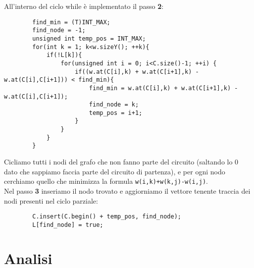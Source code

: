 \documentclass[]{article}
\begin{document}
\begin{flushleft}
All'interno del ciclo while è implementato il passo \textbf{2}:
\lstset{language=c++, style=mystyle, firstnumber=15}
\begin{lstlisting}
        find_min = (T)INT_MAX;
        find_node = -1;
        unsigned int temp_pos = INT_MAX;
        for(int k = 1; k<w.sizeY(); ++k){
            if(!L[k]){
                for(unsigned int i = 0; i<C.size()-1; ++i) {
                    if((w.at(C[i],k) + w.at(C[i+1],k) - w.at(C[i],C[i+1])) < find_min){
                        find_min = w.at(C[i],k) + w.at(C[i+1],k) - w.at(C[i],C[i+1]);
                        find_node = k;
                        temp_pos = i+1;
                    }
                }
            }
        }
\end{lstlisting}
Cicliamo tutti i nodi del grafo che non fanno parte del circuito (saltando lo 0 dato che sappiamo faccia parte del circuito di partenza), e per ogni nodo cerchiamo quello che minimizza la formula \verb|w(i,k)+w(k,j)-w(i,j)|.\\
Nel passo \textbf{3} inseriamo il nodo trovato e aggiorniamo il vettore tenente traccia dei nodi presenti nel ciclo parziale:
\lstset{language=c++, style=mystyle, firstnumber=29}
\begin{lstlisting}
        C.insert(C.begin() + temp_pos, find_node);
        L[find_node] = true;
\end{lstlisting}

\end{flushleft}
\section{Analisi}

\end{document}
